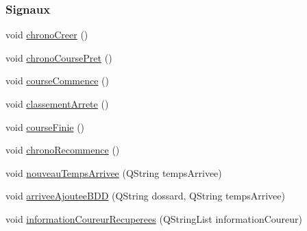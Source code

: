 \subsubsection*{Signaux}
\begin{DoxyCompactItemize}
\item 
void \hyperlink{class_course_a1c7830a51af59f70998ff0576f0aa7cd}{chrono\+Creer} ()
\item 
void \hyperlink{class_course_ab3f2a2c1bb8ed8a2550dc8fabc59e54e}{chrono\+Course\+Pret} ()
\item 
void \hyperlink{class_course_a2056f5c20f56e2c7eeea8195a55857bc}{course\+Commence} ()
\item 
void \hyperlink{class_course_a630aea833dccd20e52ada1548c334c78}{classement\+Arrete} ()
\item 
void \hyperlink{class_course_aa66c89bb34e692f17caabb21b11feeb2}{course\+Finie} ()
\item 
void \hyperlink{class_course_a178f2015d20ef5d838564671567f6831}{chrono\+Recommence} ()
\item 
void \hyperlink{class_course_abea30de9b6cec333bf19134608e5bccf}{nouveau\+Temps\+Arrivee} (Q\+String temps\+Arrivee)
\item 
void \hyperlink{class_course_aa2f0312e68f57e1437c3257d13af8186}{arrivee\+Ajoutee\+B\+DD} (Q\+String dossard, Q\+String temps\+Arrivee)
\item 
void \hyperlink{class_course_a9073b7cb57b9b8a2aee33582bb61eb20}{information\+Coureur\+Recuperees} (Q\+String\+List information\+Coureur)
\end{DoxyCompactItemize}
